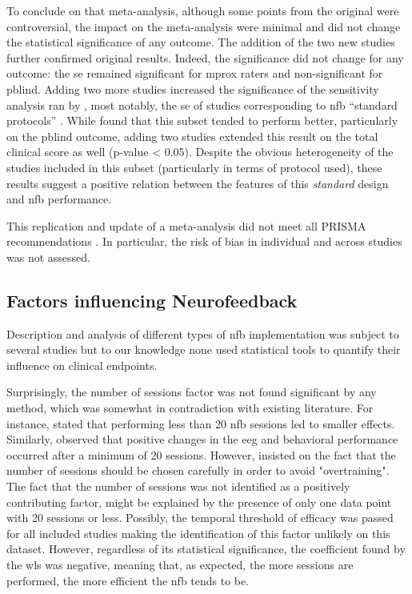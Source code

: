 To conclude on that meta-analysis, although some points from the original were controversial, the impact on the
meta-analysis were minimal and did not change the statistical significance of any outcome. 
The addition of the two new studies \citep{Strehl2017, Baumeister2016} further confirmed original results. Indeed, the
significance did not change for any outcome: the \gls{se} remained significant for \gls{mprox} raters and
non-significant for \gls{pblind}. Adding two more studies increased the significance of the sensitivity analysis ran by
\citeauthor{Cortese2016}, most notably, the \gls{se} of studies corresponding to \gls{nfb} "`standard protocols"' \citep{Arns2014}. 
While \citeauthor{Cortese2016} found that this subset tended to perform better, particularly on the \gls{pblind} outcome, 
adding two studies extended this result on the total clinical score as well (p-value < 0.05). Despite the obvious heterogeneity 
of the studies included in this subset (particularly in terms of protocol used), these results suggest a positive relation 
between the features of this \emph{standard} design and \gls{nfb} performance.

This replication and update of a meta-analysis did not meet all PRISMA recommendations \citep{Moher2009}. In particular, the risk of bias
in individual and across studies was not assessed.  

\subsection{Factors influencing Neurofeedback}

Description and analysis of different types of \gls{nfb} implementation was subject to several studies \citep{Arns2014, 
Enriquez2017, Vernon2004, Jeunet2018} but to our knowledge none used statistical tools to quantify their influence on
clinical endpoints. 

Surprisingly, the number of sessions factor was not found significant by any method, which was somewhat
in contradiction with existing literature. For instance, \citet{Arns2014} stated that performing less than
20 \gls{nfb} sessions led to smaller effects. Similarly, \citet{Vernon2004} observed that positive changes in the \gls{eeg}
and behavioral performance occurred after a minimum of 20 sessions. However, \citet{Enriquez2017} insisted on the fact that the number of
sessions should be chosen carefully in order to avoid "overtraining". The fact that the number of sessions was not identified as a 
positively contributing factor, might be explained by the presence of only one data point with 20 sessions or less. Possibly, 
the temporal threshold of efficacy was passed for all included studies making the identification of this factor unlikely on 
this dataset. However, regardless of its statistical significance, the coefficient found by the \gls{wls} was negative, meaning 
that, as expected, the more sessions are performed, the more efficient the \gls{nfb} tends to be. 

